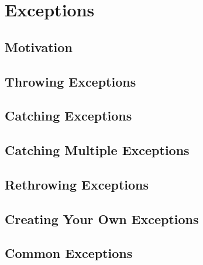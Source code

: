 \chapter{Exceptions}\label{ch:Exceptions}

\section{Motivation}\label{sec:exception-motivation}

\section{Throwing Exceptions}\label{sec:exception-throwing}

\section{Catching Exceptions}\label{sec:exception-catching}

\section{Catching Multiple Exceptions}\label{sec:exception-multi}

\section{Rethrowing Exceptions}\label{sec:exception-throw}

\section{Creating Your Own Exceptions}\label{sec:exception-create}

\section{Common Exceptions}\label{sec:exception-common}

